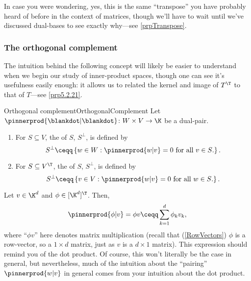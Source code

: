 In case you were wondering, yes, this is the same ``transpose'' you have probably heard of before in the context of matrices, though we'll have to wait until we've discussed dual-bases to see exactly why---see \cref{prpTranspose}.

\subsubsection{The orthogonal complement}

The intuition behind the following concept will likely be easier to understand when we begin our study of inner-product spaces, though one can see it's usefulness easily enough:  it allows us to related the kernel and image of $T^{\T}$ to that of $T$---see \cref{prp5.2.21}.
\begin{dfn}{Orthogonal complement}{OrthogonalComplement}
	Let $\pinnerprod{\blankdot |\blankdot}\colon W\times V\rightarrow \K$ be a dual-pair.
	\begin{enumerate}
		\item For $S\subseteq V$, the  of $S$, $S^{\perp}$, is defined by
		\begin{equation}
		S^{\perp}\ceqq \left\{ w\in W:\pinnerprod{w|v}=0\text{ for all }v\in S\text{.}\right\} .
		\end{equation}
		\item For $S\subseteq V^{\T}$, the  of $S$, $S^{\perp}$, is defined by
		\begin{equation}
		S^{\perp}\ceqq \left\{ v\in V:\pinnerprod{w|v}=0\text{ for all }w\in S\text{.}\right\} .
		\end{equation}
	\end{enumerate}
	\begin{rmk}
		Let $v\in \K ^d$ and $\phi \in [\K ^d]^{\T}$.  Then,
		\begin{equation}
		\pinnerprod{\phi |v}=\phi v\ceqq \sum _{k=1}^d\phi _kv_k,
		\end{equation}
		where ``$\phi v$'' here denotes matrix multiplication (recall that (\cref{RowVectors}) $\phi$ is a row-vector, so a $1\times d$ matrix, just as $v$ is a $d\times 1$ matrix).  This expression should remind you of the dot product.  Of course, this won't literally be the case in general, but nevertheless, much of the intuition about the ``pairing'' $\pinnerprod{w|v}$ in general comes from your intuition about the dot product.
		

\end{rmk}
\end{dfn}
